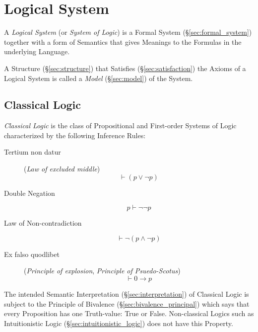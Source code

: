 \section{Logical System}\label{sec:logical_system}

A \emph{Logical System} (or \emph{System of Logic}) is a Formal System
(\S\ref{sec:formal_system}) together with a form of Semantics that
gives Meanings to the Formulas in the underlying Language.

A Structure (\S\ref{sec:structure}) that Satisfies
(\S\ref{sec:satisfaction}) the Axioms of a Logical System is called a
\emph{Model} (\S\ref{sec:model}) of the System.



\subsection{Classical Logic}\label{sec:classical_logic}

\emph{Classical Logic} is the class of Propositional and
First-order Systems of Logic characterized by the following Inference
Rules:

\begin{description}

\item [Tertium non datur] (\emph{Law of excluded middle})
  \[
    \vdash(p \vee \neg p)
  \]

\item [Double Negation]
  \[
    p \vdash \neg\neg p
  \]

\item [Law of Non-contradiction]
  \[
    \vdash \neg(p \wedge \neg p)
  \]

\item [Ex falso quodlibet] (\emph{Principle of explosion},
  \emph{Principle of Psuedo-Scotus})
  \[
    \vdash 0 \rightarrow p
  \]


\end{description}

The intended Semantic Interpretation (\S\ref{sec:interpretation}) of
Classical Logic is subject to the Principle of Bivalence
(\S\ref{sec:bivalence_principal}) which says that every Proposition
has one Truth-value: True or False. Non-classical Logics such as
Intuitionistic Logic (\S\ref{sec:intuitionistic_logic}) does not have
this Property.

